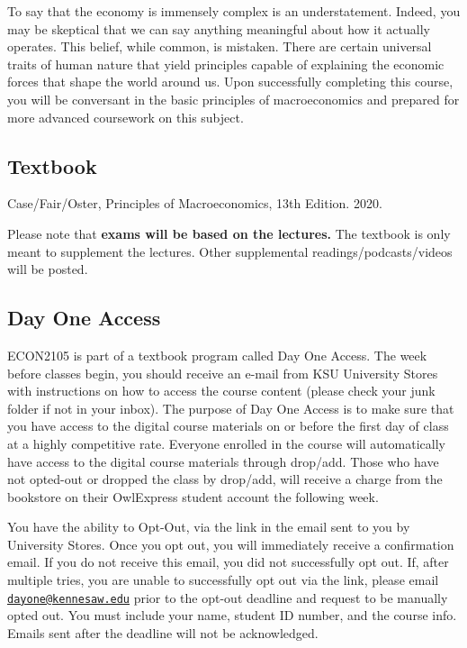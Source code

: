\documentclass[11pt,]{article}
\begin{document}
To say that the economy is immensely complex is an understatement. Indeed, you may be skeptical that we can say anything meaningful about how it actually operates. This belief, while common, is mistaken.
There are certain universal traits of human nature that yield principles capable of explaining the economic
forces that shape the world around us. Upon successfully completing this course, you will be conversant in the basic principles of macroeconomics and prepared for more advanced coursework on this subject.

\hypertarget{textbook}{%
\subsection{Textbook}\label{textbook}}

Case/Fair/Oster, Principles of Macroeconomics, 13th Edition. 2020.

Please note that \textbf{exams will be based on the lectures.} The textbook is only meant to supplement the lectures. Other supplemental readings/podcasts/videos will be posted.

\hypertarget{day-one-access}{%
\subsection*{Day One Access}\label{day-one-access}}

ECON2105 is part of a textbook program called Day One Access. The week before
classes begin, you should receive an e-mail from KSU University Stores with instructions on how
to access the course content (please check your junk folder if not in your inbox). The purpose
of Day One Access is to make sure that you have access to the digital course materials on or
before the first day of class at a highly competitive rate. Everyone enrolled in the course will
automatically have access to the digital course materials through drop/add. Those who have
not opted-out or dropped the class by drop/add, will receive a charge from the bookstore on
their OwlExpress student account the following week.

You have the ability to Opt-Out, via the link in the email sent to you by University Stores. Once
you opt out, you will immediately receive a confirmation email. If you do not receive this email,
you did not successfully opt out. If, after multiple tries, you are unable to successfully opt out
via the link, please email \href{mailto:dayone@kennesaw.edu}{\nolinkurl{dayone@kennesaw.edu}} prior to the opt-out deadline and request to
be manually opted out. You must include your name, student ID number, and the course info.
Emails sent after the deadline will not be acknowledged.
\end{document}
